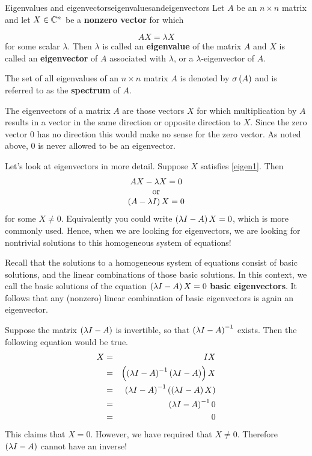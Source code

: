 \begin{definition}{Eigenvalues and eigenvectors}{eigenvaluesandeigenvectors}
Let $A$ be an $n\times n$ matrix and let $X \in \mathbb{C}^{n}$ be a
\textbf{nonzero vector} for which

\begin{equation}
AX=\lambda X  \label{eigen1}
\end{equation}
for some scalar $\lambda .$ Then $\lambda $ is called an
\textbf{eigenvalue}
of the matrix $A$ and $X$ is called an \textbf{eigenvector} of $A$ associated with $\lambda$, or a $\lambda$-eigenvector of $A$. 
 
The set of all eigenvalues of an $n\times n$ matrix $A$ is denoted by 
$\sigma \left(A\right) $ and is referred to as the \textbf{spectrum} of $A.$
\end{definition}

The eigenvectors of a matrix $A$ are those vectors $X$ for which
multiplication by $A$ results in a vector in the same direction or opposite
direction to $X$. Since the zero vector $0$ has no
direction this would make no sense for the zero vector. As noted above, 
$0$ is never allowed to be an eigenvector. 

Let's look at eigenvectors in more detail. Suppose $X$ satisfies \ref{eigen1}. Then
\begin{equation*}
\begin{array}{c}
AX - \lambda X = 0 \\
\mbox{or} \\
\left(A-\lambda I\right) X = 0
\end{array}
\end{equation*}
for some $X \neq 0.$ Equivalently you could write $\left(\lambda
I-A\right)X = 0$, which is more commonly used.  Hence, when we are looking for eigenvectors, we are
looking for nontrivial solutions to this homogeneous system of equations!

Recall that the solutions to a homogeneous system of equations consist
of basic solutions, and the linear combinations of those basic
solutions. In this context, we call the basic solutions of the
equation $\left(\lambda I - A\right) X = 0$ \textbf{basic
eigenvectors}. It follows that any (nonzero) linear combination of basic
eigenvectors is again an eigenvector.

Suppose the matrix $\left(\lambda I - A\right)$ is invertible, so that
$\left(\lambda I - A\right)^{-1}$ exists.
Then the following equation would be true.
\begin{eqnarray*}
X &=& IX \\
&=& \left(\left(\lambda I - A\right) ^{-1}\left(\lambda I - A \right)
\right) X \\
&=&\left(\lambda I - A\right) ^{-1}\left(\left(\lambda
I - A\right) X\right) \\
&=& \left(\lambda I - A\right) ^{-1}0 \\
&=& 0
\end{eqnarray*}
This claims that $X=0$. However, we have required that $ X \neq 0$. Therefore  $\left(\lambda I - A\right)$
cannot have an inverse! 

